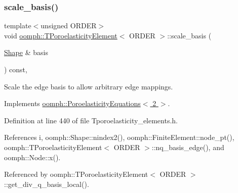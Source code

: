 \subsubsection{\texorpdfstring{scale\+\_\+basis()}{scale\_basis()}}
{\footnotesize\ttfamily template$<$unsigned O\+R\+D\+ER$>$ \\
void \hyperlink{classoomph_1_1TPoroelasticityElement}{oomph\+::\+T\+Poroelasticity\+Element}$<$ O\+R\+D\+ER $>$\+::scale\+\_\+basis (\begin{DoxyParamCaption}\item[{\hyperlink{classoomph_1_1Shape}{Shape} \&}]{basis }\end{DoxyParamCaption}) const\hspace{0.3cm}{\ttfamily [inline]}, {\ttfamily [virtual]}}



Scale the edge basis to allow arbitrary edge mappings. 



Implements \hyperlink{classoomph_1_1PoroelasticityEquations_a92c3f4965f318a98eb7c6ac06de7aa4d}{oomph\+::\+Poroelasticity\+Equations$<$ 2 $>$}.



Definition at line 440 of file Tporoelasticity\+\_\+elements.\+h.



References i, oomph\+::\+Shape\+::nindex2(), oomph\+::\+Finite\+Element\+::node\+\_\+pt(), oomph\+::\+T\+Poroelasticity\+Element$<$ O\+R\+D\+E\+R $>$\+::nq\+\_\+basis\+\_\+edge(), and oomph\+::\+Node\+::x().



Referenced by oomph\+::\+T\+Poroelasticity\+Element$<$ O\+R\+D\+E\+R $>$\+::get\+\_\+div\+\_\+q\+\_\+basis\+\_\+local().

\mbox{\label{classoomph_1_1TPoroelasticityElement_a309bfa8c38a43d062ffe7395e32e6d5f}} 
